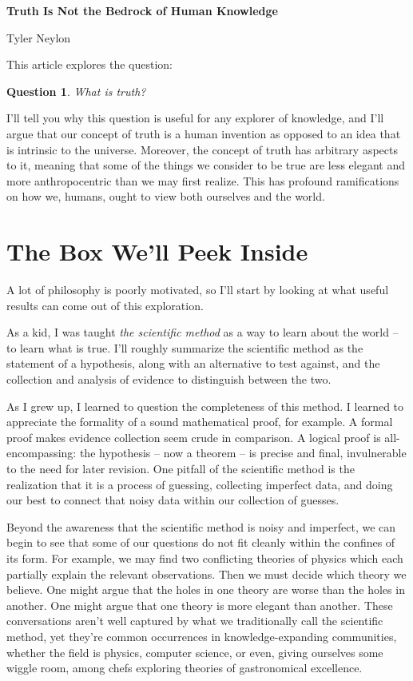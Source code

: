 \documentclass[11pt, oneside]{article}   	%
\newtheorem{question}{Question}
\begin{document}
{\bf Truth Is Not the Bedrock of Human Knowledge}

Tyler Neylon

\bigskip

This article explores the question:
\begin{question}\label{q1}
    What is truth?
\end{question}

I'll tell you why this question is useful for any explorer of knowledge, and
I'll argue that our concept of truth is a human invention as opposed to an idea
that is intrinsic to the universe.
Moreover, the concept of truth has arbitrary aspects to it, meaning that some of
the things we consider to be true are less elegant and more anthropocentric than
we may first realize. This has profound ramifications on how we, humans, ought
to view both ourselves and the world.

\section{The Box We'll Peek Inside}

A lot of philosophy is poorly motivated, so I'll start by
looking at what useful results can come out of this exploration.

As a kid, I was taught {\em the scientific method} as a way to
learn about the world -- to learn what is true.
I'll roughly summarize the scientific method as the statement
of a hypothesis, along with an alternative to test against, and
the collection and analysis of evidence to distinguish between
the two.

As I grew up, I
learned to question the completeness of this method.
I learned to appreciate the formality of a sound
mathematical proof, for example. A formal proof makes evidence collection seem
crude in
comparison. A logical proof is all-encompassing: the hypothesis -- now a theorem
-- is
precise and final,
invulnerable to the need for later revision.
One pitfall of the scientific method is the realization that it
is a process of guessing, collecting imperfect data, and doing our best to
connect that noisy data within our collection of guesses.

Beyond the awareness that the scientific method is noisy and imperfect, we can
begin to see that some of our questions do not fit cleanly within the confines
of its form. For example, we may find two conflicting theories of physics which
each partially explain the relevant observations. Then we must decide
which theory we believe. One might argue that the holes in one theory are worse
than the holes in another. One might argue that one theory is more elegant than
another.
These conversations aren't well captured by what we traditionally call the
scientific method, yet
they're common occurrences in knowledge-expanding communities,
whether the field is physics, computer science, or even, giving
ourselves some wiggle room, among chefs exploring theories of gastronomical
excellence.
\end{document}
